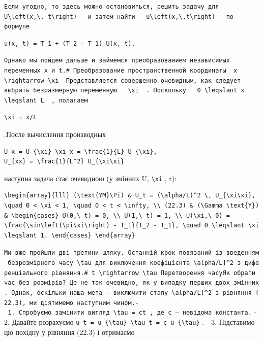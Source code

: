 \documentclass[
  ukrainian,
]{article}
\begin{document}
\begin{verbatim}
Если угодно, то здесь можно остановиться, решить задачу для   U\left(x,\, t\right)   и затем найти   u\left(x,\,t\right)   по формуле
\end{verbatim}

\begin{verbatim}
u(x, t) = T_1 + (T_2 - T_1) U(x, t).
\end{verbatim}

\begin{verbatim}
Однако мы пойдем дальше и займемся преобразованием независимых переменных x и t.# Преобразование пространственной координаты  x \rightarrow \xi  Представляется совершенно очевидным, как следует выбрать безразмерную переменную   \xi  . Поскольку   0 \leqslant x \leqslant L  , полагаем
\end{verbatim}

\begin{verbatim}
\xi = x/L
\end{verbatim}

.После вычисления производных

\begin{verbatim}
U_x = U_{\xi} \xi_x = \frac{1}{L} U_{\xi},
U_{xx} = \frac{1}{L^2} U_{\xi\xi}
\end{verbatim}

наступна задача стає очевидною (у змінних U, \texttt{\textbackslash{}xi}
, t):

\begin{verbatim}
\begin{array}{lll} (\text{YM}\Pi) & U_t = (\alpha/L)^2 \, U_{\xi\xi}, \quad 0 < \xi < 1, \quad 0 < t < \infty, \\ (22.3) & (\Gamma \text{Y}) & \begin{cases} U(0,\ t) = 0, \\ U(1,\ t) = 1, \\ U(\xi,\ 0) = \frac{\sin\left(\pi\xi\right) - T_1}{T_2 - T_1}, \quad 0 \leqslant \xi \leqslant 1. \end{cases} \end{array}
\end{verbatim}

\texttt{Ми\ вже\ пройшли\ дві\ третини\ шляху.\ Останній\ крок\ пов\textquotesingle{}язаний\ із\ введенням\ безрозмірного\ часу\ \textquotesingle{}\textbackslash{}tau\textquotesingle{}\ для\ виключення\ коефіцієнта\ \textquotesingle{}{[}\textbackslash{}alpha/L{]}\^{}2\textquotesingle{}\ з\ диференціального\ рівняння.\#\ \textquotesingle{}t\ \textbackslash{}rightarrow\ \textbackslash{}tau\textquotesingle{}\ Перетворення\ часуЯк\ обрати\ час\ без\ розмірів?\ Це\ не\ так\ очевидно,\ як\ у\ випадку\ перших\ двох\ змінних.\ Однак,\ оскільки\ наша\ мета\ —\ виключити\ сталу\ \textquotesingle{}{[}\textbackslash{}alpha/L{]}\^{}2\textquotesingle{}\ з\ рівняння\ (22.3),\ ми\ діятимемо\ наступним\ чином.-\ 1.\ Спробуємо\ замінити\ вигляд\ \textquotesingle{}\textbackslash{}tau\ =\ ct\textquotesingle{}\ ,\ де\ c\ —\ невідома\ константа.}
- 2. Давайте розрахуємо
\texttt{u\_t\ =\ u\_\{\textbackslash{}tau\}\ \textbackslash{}tau\_t\ =\ c\ u\_\{\textbackslash{}tau\}}
. - 3. Підставимо цю похідну у рівняння (22.3) і отримаємо
\end{document}
